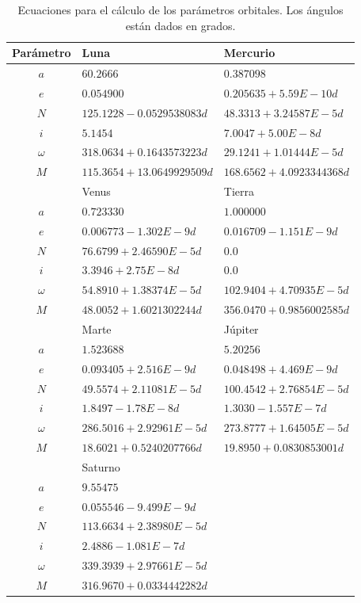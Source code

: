 \documentclass[a4paper,10pt]{article}
\begin{document}
\begin{table}
  \centering
  \begin{tabular}{cll}
    \hline
    Parámetro & Luna & Mercurio \\
    \hline
    $a     $ & $60.2666                  $  & $0.387098                $ \\
    $e     $ & $0.054900                 $  & $0.205635 + 5.59E-10d    $ \\
    $N     $ & $125.1228 - 0.0529538083d $  & $48.3313 + 3.24587E-5d   $ \\
    $i     $ & $5.1454                   $  & $7.0047 + 5.00E-8d       $ \\
    $\omega$ & $318.0634 + 0.1643573223d $  & $29.1241 + 1.01444E-5d   $ \\
    $M     $ & $115.3654 + 13.0649929509d$  & $168.6562 + 4.0923344368d$ \\
    \hline      
              & Venus & Tierra \\
    $a     $ & $0.723330               $  & $1.000000                $ \\
    $e     $ & $0.006773 - 1.302E-9d   $  & $0.016709 - 1.151E-9d    $ \\
    $N     $ & $76.6799 + 2.46590E-5d  $  & $0.0                     $ \\
    $i     $ & $3.3946 + 2.75E-8d      $  & $0.0                     $ \\
    $\omega$ & $54.8910 + 1.38374E-5d  $  & $102.9404 + 4.70935E-5d  $ \\
    $M     $ & $48.0052 + 1.6021302244d$  & $356.0470 + 0.9856002585d$ \\
    \hline
              & Marte & Júpiter \\
    $a     $ & $1.523688               $  & $5.20256                $ \\
    $e     $ & $0.093405 + 2.516E-9d   $  & $0.048498 + 4.469E-9d   $ \\
    $N     $ & $49.5574 + 2.11081E-5d  $  & $100.4542 + 2.76854E-5d $ \\
    $i     $ & $1.8497 - 1.78E-8d      $  & $1.3030 - 1.557E-7d     $ \\
    $\omega$ & $286.5016 + 2.92961E-5d $  & $273.8777 + 1.64505E-5d $ \\
    $M     $ & $18.6021 + 0.5240207766d$  & $19.8950 + 0.0830853001d$ \\
    \hline
              & Saturno & \\
    $a     $ & $9.55475                 $  & $ $ \\
    $e     $ & $0.055546 - 9.499E-9d    $  & $ $ \\
    $N     $ & $113.6634 + 2.38980E-5d  $  & $ $ \\
    $i     $ & $2.4886 - 1.081E-7d      $  & $ $ \\
    $\omega$ & $339.3939 + 2.97661E-5d  $  & $ $ \\
    $M     $ & $316.9670 + 0.0334442282d$  & $ $ \\
    \hline
  \end{tabular}
  \caption{Ecuaciones para el cálculo de los parámetros orbitales. Los ángulos están dados en grados.}
  \label{tab:OrbitalParams}
\end{table}
\end{document}
